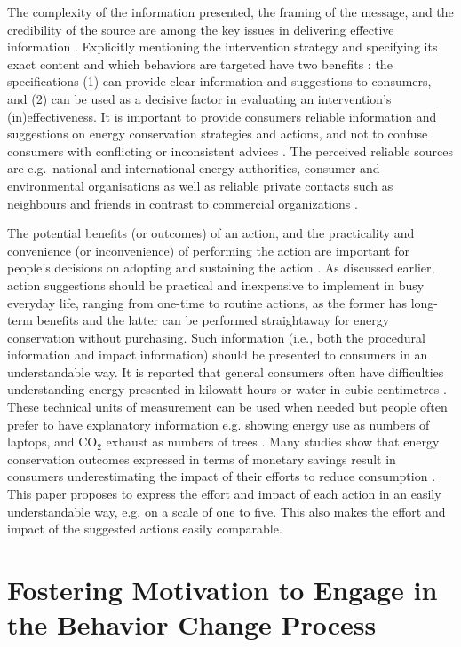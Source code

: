 \documentclass[a4paper]{article}
\begin{document}
The complexity of the information presented, the framing of the message, and the credibility of the source are among the key issues in delivering effective information \citep{Schultz2002}. Explicitly mentioning the intervention strategy and specifying its exact content and which behaviors are targeted have two benefits \citep{Abrahamse2005}: the specifications (1) can provide clear information and suggestions to consumers, and (2) can be used as a decisive factor in evaluating an intervention's (in)effectiveness. It is important to provide consumers reliable information and suggestions on energy conservation strategies and actions, and not to confuse consumers with conflicting or inconsistent advices \citep{CEER2015}. The perceived reliable sources are e.g.~national and international energy authorities, consumer and environmental organisations \citep{CEER2015} as well as reliable private contacts such as neighbours and friends in contrast to commercial organizations \citep{Selvefors2015}.

The potential benefits (or outcomes) of an action, and the practicality and convenience (or inconvenience) of performing the action are important for people's decisions on adopting and sustaining the action \citep{Schultz2002,Claudy2013}. As discussed earlier, action suggestions should be practical and inexpensive to implement in busy everyday life, ranging from one-time to routine actions, as the former has long-term benefits and the latter can be performed straightaway for energy conservation without purchasing. Such information (i.e., both the procedural information and impact information) should be presented to consumers in an understandable way. It is reported that general consumers often have difficulties understanding energy presented in kilowatt hours or water in cubic centimetres \citep{Froehlich2009,+}. These technical units of measurement can be used when needed but people often prefer to have explanatory information e.g. showing energy use as numbers of laptops, and CO$_{2}$ exhaust as numbers of trees \citep{Petkov2011}. Many studies show that energy conservation outcomes expressed in terms of monetary savings result in consumers underestimating the impact of their efforts to reduce consumption \citep{Froehlich2009,Pierce2010,Abrahamse2013}. This paper proposes to express the effort and impact of each action in an easily understandable way, e.g. on a scale of one to five. This also makes the effort and impact of the suggested actions easily comparable. 


\section{Fostering Motivation to Engage in the Behavior Change Process}
\label{sec:motivation}
\end{document}
